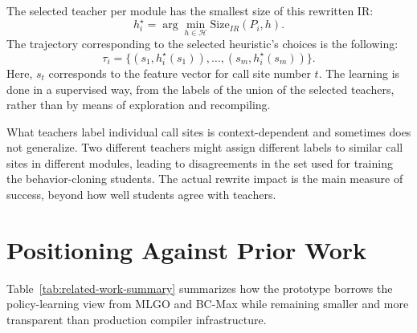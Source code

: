 \documentclass[12pt, a4paper]{report}
\begin{document}
The selected teacher per module has the smallest size of this rewritten IR:
\[
  h^\star_i = \arg\min_{h \in \mathcal{H}} \mathrm{Size}_{IR}(P_i, h).
\]
The trajectory corresponding to the selected heuristic's choices is the
following:
\[
  \tau_i = \{(s_1, h^\star_i(s_1)), \ldots, (s_m, h^\star_i(s_m))\}.
\]
Here, \(s_t\) corresponds to the feature vector for call site number \(t\).
The learning is done in a supervised way, from the labels of the union of
the selected teachers, rather than by means of exploration and recompiling.

What teachers label individual call sites is context-dependent and sometimes
does not generalize. Two different teachers might assign different labels to
similar call sites in different modules, leading to disagreements in the set used
for training the behavior-cloning students. The actual rewrite impact is the
main measure of success, beyond how well students agree with teachers.

\section{Positioning Against Prior Work}

Table~\ref{tab:related-work-summary} summarizes how the prototype borrows the
policy-learning view from MLGO and BC-Max while remaining smaller and more
transparent than production compiler infrastructure.
\end{document}
